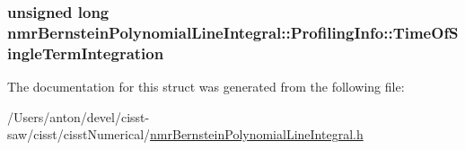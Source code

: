 \subsubsection[{Time\+Of\+Single\+Term\+Integration}]{\setlength{\rightskip}{0pt plus 5cm}unsigned long nmr\+Bernstein\+Polynomial\+Line\+Integral\+::\+Profiling\+Info\+::\+Time\+Of\+Single\+Term\+Integration}\label{structnmr_bernstein_polynomial_line_integral_1_1_profiling_info_a6aabda6c9c68e2e233a7445c1ef49557}


The documentation for this struct was generated from the following file\+:\begin{DoxyCompactItemize}
\item 
/\+Users/anton/devel/cisst-\/saw/cisst/cisst\+Numerical/\hyperlink{nmr_bernstein_polynomial_line_integral_8h}{nmr\+Bernstein\+Polynomial\+Line\+Integral.\+h}\end{DoxyCompactItemize}
